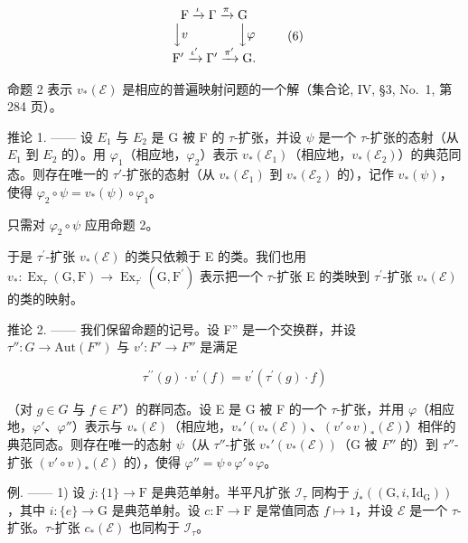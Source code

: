 \[
\begin{array}{c} \mathrm{F} \xrightarrow {\iota} \Gamma \xrightarrow {\pi} \mathrm{G} \\ \Big \downarrow v \qquad \qquad \Big \downarrow \varphi \\ \mathrm{F} ^ {\prime} \xrightarrow {\iota^ {\prime}} \Gamma^ {\prime} \xrightarrow {\pi^ {\prime}} \mathrm{G}. \end{array}\tag{6}
\]

命题 2 表示 \(v_{*}(\mathcal{E})\) 是相应的普遍映射问题的一个解（集合论, IV, §3, No.~1, 第 284 页）。

推论 1. —— 设 \(E_{1}\) 与 \(E_{2}\) 是 G 被 F 的 \(\tau\)-扩张，并设 \(\psi\) 是一个 \(\tau\)-扩张的态射（从 \(E_{1}\) 到 \(E_{2}\) 的）。用 \(\varphi_{1}\)（相应地，\(\varphi_{2}\)）表示 \(v_{*}(\mathcal{E}_{1})\)（相应地，\(v_{*}(\mathcal{E}_{2})\)）的典范同态。则存在唯一的 \(\tau'\)-扩张的态射（从 \(v_{*}(\mathcal{E}_{1})\) 到 \(v_{*}(\mathcal{E}_{2})\) 的），记作 \(v_{*}(\psi)\)，使得 \(\varphi_{2} \circ \psi = v_{*}(\psi) \circ \varphi_{1}\)。

只需对 \(\varphi_{2} \circ \psi\) 应用命题 2。

于是 \(\tau^{\prime}\)-扩张 \(v_{*}(\mathcal{E})\) 的类只依赖于 E 的类。我们也用 \(v_{*}:\operatorname{Ex}_{\tau}(\mathrm{G},\mathrm{F})\to\operatorname{Ex}_{\tau^{\prime}}(\mathrm{G},\mathrm{F}^{\prime})\) 表示把一个 \(\tau\)-扩张 E 的类映到 \(\tau^{\prime}\)-扩张 \(v_{*}(\mathcal{E})\) 的类的映射。

推论 2. —— 我们保留命题的记号。设 F'' 是一个交换群，并设 \(\tau'' : G \to \text{Aut}(F'')\) 与 \(v': F' \to F''\) 是满足

\[
\tau^ {\prime \prime} (g) \cdot v ^ {\prime} (f) = v ^ {\prime} (\tau^ {\prime} (g) \cdot f)
\]

（对 \(g \in G\) 与 \(f \in F'\)）的群同态。设 E 是 G 被 F 的一个 \(\tau\)-扩张，并用 \(\varphi\)（相应地，\(\varphi'\)、\(\varphi''\)）表示与 \(v_{*}(\mathcal{E})\)（相应地，\(v_{*}'(v_{*}(\mathcal{E}))\)、\((v' \circ v)_{*}(\mathcal{E})\)）相伴的典范同态。则存在唯一的态射 \(\psi\)（从 \(\tau''\)-扩张 \(v_{*}'(v_{*}(\mathcal{E}))\)（G 被 \(F''\) 的）到 \(\tau''\)-扩张 \((v' \circ v)_{*}(\mathcal{E})\) 的），使得 \(\varphi'' = \psi \circ \varphi' \circ \varphi\)。

例. —— 1) 设 \(j: \{1\} \to \mathrm{F}\) 是典范单射。半平凡扩张 \(\mathcal{I}_{\tau}\) 同构于 \(j_{*}((\mathrm{G}, i, \mathrm{Id}_{\mathrm{G}}))\)，其中 \(i: \{e\} \to \mathrm{G}\) 是典范单射。设 \(c: \mathrm{F} \to \mathrm{F}\) 是常值同态 \(f \mapsto 1\)，并设 \(\mathcal{E}\) 是一个 \(\tau\)-扩张。\(\tau\)-扩张 \(c_{*}(\mathcal{E})\) 也同构于 \(\mathcal{I}_{\tau}\)。

